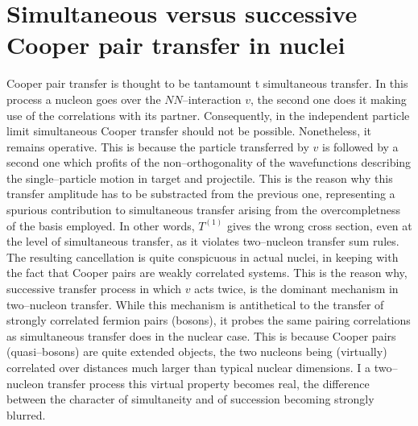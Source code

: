 \documentclass[a4paper,11pt]{book}
\numberwithin{equation}{section}
\numberwithin{figure}{section}
\numberwithin{table}{section}
\begin{document}
\section{Simultaneous versus successive Cooper pair transfer in nuclei}
Cooper pair transfer is thought to be tantamount t simultaneous transfer. In this process a nucleon goes over the $NN$--interaction $v$, the second one does it making use of the correlations with its partner. Consequently, in the independent particle limit simultaneous Cooper transfer should not be possible. Nonetheless, it remains operative. This is because the particle transferred by $v$ is followed by a second one which profits of the non--orthogonality of the wavefunctions describing the single--particle motion in target and projectile. This is the reason why this transfer amplitude has to be substracted from the previous one, representing a spurious contribution to simultaneous transfer arising from the overcompletness of the basis employed. In other words, $T^{(1)}$ gives the wrong cross section, even at the level of simultaneous transfer, as it violates two--nucleon transfer sum rules. The resulting cancellation is quite conspicuous in actual nuclei, in keeping with the fact that Cooper pairs are weakly correlated systems. This is the reason why, successive transfer process in which $v$ acts twice, is the dominant mechanism in two--nucleon transfer. While this mechanism is antithetical to the transfer of strongly correlated fermion pairs (bosons), it probes the same pairing correlations as simultaneous transfer does in the nuclear case. This is because Cooper pairs (quasi--bosons) are quite extended objects, the two nucleons being (virtually) correlated over distances much larger than typical nuclear dimensions. I a two--nucleon transfer process this virtual property becomes real, the difference between the character of simultaneity and of succession becoming strongly blurred.
\end{document}

